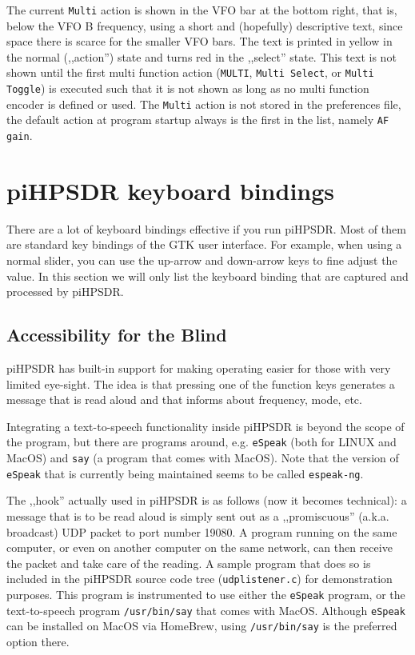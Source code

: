 \documentclass[12pt]{book}
\def\bltt#1{\texttt{\color{blue}#1}}
\def\pH{pi\-HPSDR\xspace}
\begin{document}
The current \bltt{Multi} action is shown in the VFO bar at the bottom right, that is, below
the VFO B frequency, using a short and (hopefully) descriptive text, since space there is
scarce for the smaller VFO bars. The text is printed in yellow in the normal (,,action'') state and
turns red in the ,,select'' state. This text is not shown until the first multi function action
(\bltt{MULTI}, \bltt{Multi Select}, or \bltt{Multi Toggle}) is executed such that it is not
shown as long as no multi function encoder is defined or used. The \bltt{Multi} action is not
stored in the preferences file, the default action at program startup always is the first in the list,
namely \bltt{AF gain}.
\chapter[Keyboard bindings]{\pH keyboard bindings}

There are a lot of keyboard bindings effective if you run \pH. Most of them are
standard key bindings of the GTK user interface. For example, when using a normal
slider, you can use the up-arrow and down-arrow keys to fine adjust the value. In this
section we will only list the keyboard binding that are captured and processed by \pH.

\section{Accessibility for the Blind}

\pH has built-in support for making operating easier for those with very limited
eye-sight. The idea is that pressing one of the function keys generates a message that
is read aloud and that informs about frequency, mode, etc.

Integrating a text-to-speech functionality inside \pH is beyond the scope of the program,
but there are programs around, e.g. \texttt{eSpeak} (both for LINUX and MacOS) and
\texttt{say} (a program that comes with MacOS). Note that the version of \texttt{eSpeak}
that is currently being maintained seems to be called \texttt{espeak-ng}.

The ,,hook'' actually used
in \pH is as follows (now it becomes technical): a message that is to be read aloud is
simply sent out as a ,,promiscuous'' (a.k.a. broadcast) UDP packet to port number 19080.
A program running on the same computer, or even on another computer on the same network, can
then receive the packet and take care of the reading. A sample program that does so
is included in the \pH source code tree (\texttt{udplistener.c}) for demonstration purposes.
This program is instrumented to use either the \texttt{eSpeak} program, or the text-to-speech
program \texttt{/usr/bin/say} that comes with MacOS. Although \texttt{eSpeak} can
be installed on MacOS via HomeBrew, using  \texttt{/usr/bin/say}  is the preferred option there.
\end{document}
